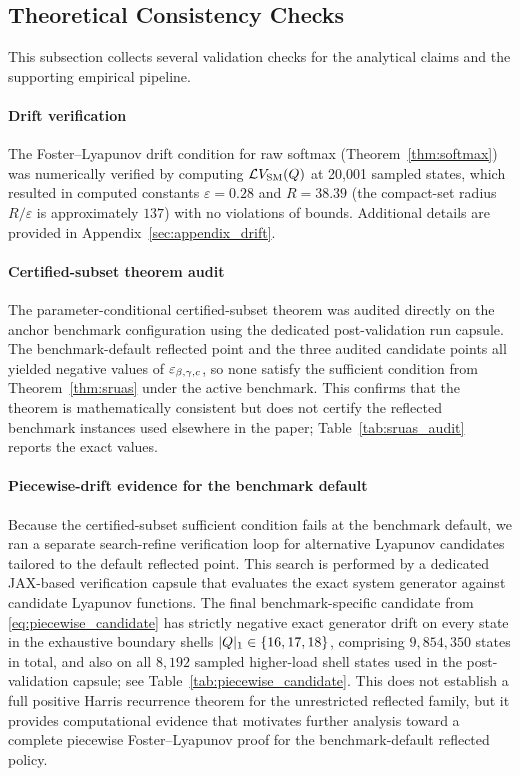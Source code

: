 \subsection{Theoretical Consistency Checks}
\label{sec:exp:theory}

This subsection collects several validation checks for the analytical claims and the supporting empirical pipeline.

\paragraph{Drift verification}
The Foster--Lyapunov drift condition for raw softmax (Theorem~\ref{thm:softmax}) was numerically verified by computing $\mathcal{L} V_{\mathrm{SM}}(Q)$ at 20{,}001 sampled states, which resulted in computed constants $\varepsilon = 0.28$ and $R = 38.39$ (the compact-set radius $R/\varepsilon$ is approximately $137$) with no violations of bounds.
Additional details are provided in Appendix~\ref{sec:appendix_drift}.

\paragraph{Certified-subset theorem audit}
The parameter-conditional certified-subset theorem was audited directly on the anchor benchmark configuration using the dedicated post-validation run capsule.
The benchmark-default reflected point and the three audited candidate points all yielded negative values of $\varepsilon_{\beta,\gamma,c}$, so none satisfy the sufficient condition from Theorem~\ref{thm:sruas} under the active benchmark.
This confirms that the theorem is mathematically consistent but does not certify the reflected benchmark instances used elsewhere in the paper; Table~\ref{tab:sruas_audit} reports the exact values.

\paragraph{Piecewise-drift evidence for the benchmark default}
Because the certified-subset sufficient condition fails at the benchmark default, we ran a separate search-refine verification loop for alternative Lyapunov candidates tailored to the default reflected point. This search is performed by a dedicated JAX-based verification capsule that evaluates the exact system generator against candidate Lyapunov functions.
The final benchmark-specific candidate from \cref{eq:piecewise_candidate} has strictly negative exact generator drift on every state in the exhaustive boundary shells $|Q|_1 \in \{16,17,18\}$, comprising $9{,}854{,}350$ states in total, and also on all $8{,}192$ sampled higher-load shell states used in the post-validation capsule; see Table~\ref{tab:piecewise_candidate}.
This does not establish a full positive Harris recurrence theorem for the unrestricted reflected family, but it provides computational evidence that motivates further analysis toward a complete piecewise Foster--Lyapunov proof for the benchmark-default reflected policy.

